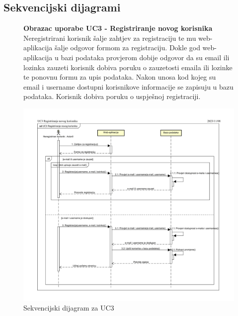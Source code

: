 			\subsection{Sekvencijski dijagrami}
				
			\begin{figure}[H]
				\textbf{Obrazac uporabe UC3 - Registriranje novog korisnika}\\

				Neregistrirani korisnik šalje zahtjev za registraciju te mu web-aplikacija šalje odgovor formom za registraciju. Dokle god web-aplikacija u bazi podataka provjerom dobije odgovor da su email ili lozinka zauzeti korisnik dobiva poruku o zauzetosti emaila ili lozinke te ponovnu formu za upis podataka. Nakon unosa kod kojeg su email i username dostupni korisnikove informacije se zapisuju u bazu podataka. Korisnik dobiva poruku o uspješnoj registraciji.
				\begin{center}
					\includegraphics[scale = 0.8]{slike/SEK_UC3_Registriranje_novog_korisnika.png}
					\caption{Sekvencijski dijagram za UC3}
					\label{fig:Sek_UC3}
				\end{center}
			\end{figure}

